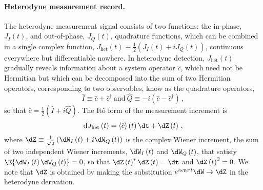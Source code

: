 \paragraph{Heterodyne measurement record. }

The heterodyne measurement signal consists of two functions: the in-phase,
$J_{I}\left(t\right)$, and out-of-phase, $J_{Q}\left(t\right)$,
quadrature functions, which can be combined in a single complex function,
$J_{\mathrm{het}}\left(t\right)\equiv\frac{1}{2}\left(J_{I}\left(t\right)+iJ_{Q}\left(t\right)\right)$,
continuous everywhere but differentiable nowhere.  In heterodyne
detection, $J_{\mathrm{het}}\left(t\right)$ gradually reveals information
about a system operator $\hat{c}$, which need not be Hermitian but
which can be decomposed into the sum of two Hermitian operators, corresponding
to two observables, know as the quadrature operators, 
\begin{equation}
\hat{I}\equiv\hat{c}+\hat{c}^{\dagger}\ \text{and}\ \hat{Q}\equiv-i\left(\hat{c}-\hat{c}^{\dagger}\right)\,,
\end{equation}
so that $\hat{c}=\frac{1}{2}\left(\hat{I}+i\hat{Q}\right)$. The Itô
form of the measurement increment is 
\begin{equation}
\mathrm{d}J_{\mathrm{het}}\left(t\right)=\left\langle \hat{c}\right\rangle \left(t\right)\dt+\dZ\left(t\right)\,,\label{eq:Jhet-perfect}
\end{equation}
where $\dZ\equiv\frac{1}{\sqrt{2}}\left(\dW_{I}\left(t\right)+i\dW_{Q}\left(t\right)\right)$
is the complex Wiener increment, the sum of two independent Wiener
increments, $\dW_{I}\left(t\right)$ and $\dW_{Q}\left(t\right)$,
that satisfy $\E{\dW_{I}\left(t\right)\dW_{Q}\left(t\right)}=0$,
so that $\dZ\left(t\right)^{*}\dZ\left(t\right)=\dt$ and $\dZ\left(t\right)^{2}=0$.
We note that $\dZ$ is obtained by making the substitution $e^{i\omega_{{\rm RF}}t}\dW\rightarrow\dZ$
in the heterodyne derivation.

